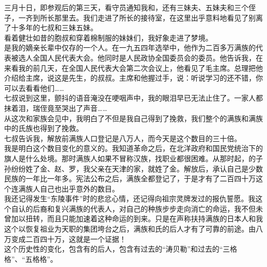 三月十日，即参观后的第三天，看守员通知我和，还有三妹夫、五妹夫和三个侄子，一齐到所长那里去。我们走进了所长的接待室，在这里出乎意料地看见了别离了十多年的七叔和三妹五妹。\\

看着健壮如昔的胞叔和穿着棉制服的妹妹们，我好象走进了梦境。\\

是我的嫡亲长辈中仅存的一个人。在一九五四年选举中，他作为二百多万满族的代表被选人全国人民代表大会。他同时是人民政协全国委员会的委员。他告诉我，在来看我的前几天，在全国人民代表大会第二次会议上，他看见了毛主席。总理把他介绍给主席，说这是先生，的叔叔。主席和他握过手，说：听说学习的还不错，你可以去看看他们……\\

七叔说到这里，颤抖的语音淹没在哽咽声中，我的眼泪早已无法止住了。一家人都抹着泪，瑞侄竟至哭出了声音……\\

从这次和家族会见中，我明白了不但是我自己得到了挽救，我们整个的满族和满族中的氏族也得到了挽救。\\

七叔告诉我，解放前满族人口登记是八万人，而今天是这个数目的三十倍。\\

我是明白这个数目变化的意义的。我知道革命之后，在北洋政府和国民党统治下的旗人是什么处境。那时满族人如果不冒称汉族，找职业都很困难。从那时起，的子孙纷纷姓了金、赵、罗，我父亲在天津的家，就姓了金。解放后，承认自己是少数民族的一年比一年多。宪法公布之后，满族全都登记了，于是才有了二百四十万这个连满族人自己也出乎意外的数目。\\

我还记得发生“东陵事件”时的悲忿心情，还记得向祖宗灵牌发过的报仇誓愿。我这个自认的后裔和复兴满族的代表人，对自己的种族步步走向消亡的命运，我不但未曾加以扭转，而且只能加速着这种命运的到来。只是在声称扶持满族的日本人和我这个以恢复祖业为天职的集团垮台之后，满族和氏的后人才有了可靠的前途。由八万变成二百四十万，这就是一个证据！\\

这个历史性的变化，包含有的后人，包含有过去的“涛贝勒”和过去的“三格格”、“五格格”。\\

